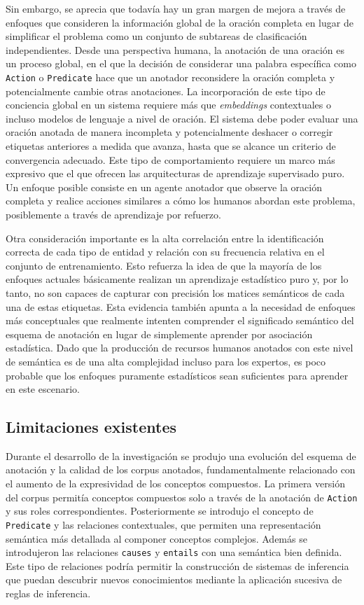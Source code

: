 Sin embargo, se aprecia que todavía hay un gran margen de mejora a través de enfoques que consideren la información global de la oración completa en lugar de simplificar el problema como un conjunto de subtareas de clasificación independientes. Desde una perspectiva humana, la anotación de una oración es un proceso global, en el que la decisión de considerar una palabra específica como \texttt{Action} o \texttt{Predicate} hace que un anotador reconsidere la oración completa y potencialmente cambie otras anotaciones. La incorporación de este tipo de conciencia global en un sistema requiere más que \textit{embeddings} contextuales o incluso modelos de lenguaje a nivel de oración. El sistema debe poder evaluar una oración anotada de manera incompleta y potencialmente deshacer o corregir etiquetas anteriores a medida que avanza, hasta que se alcance un criterio de convergencia adecuado. Este tipo de comportamiento requiere un marco más expresivo que el que ofrecen las arquitecturas de aprendizaje supervisado puro. Un enfoque posible consiste en un agente anotador que observe la oración completa y realice acciones similares a cómo los humanos abordan este problema, posiblemente a través de aprendizaje por refuerzo.

Otra consideración importante es la alta correlación entre la identificación correcta de cada tipo de entidad y relación con su frecuencia relativa en el conjunto de entrenamiento.
Esto refuerza la idea de que la mayoría de los enfoques actuales básicamente realizan un aprendizaje estadístico puro y, por lo tanto, no son capaces de capturar con precisión los matices semánticos de cada una de estas etiquetas.
Esta evidencia también apunta a la necesidad de enfoques más conceptuales que realmente intenten comprender el significado semántico del esquema de anotación en lugar de simplemente aprender por asociación estadística. Dado que la producción de recursos humanos anotados con este nivel de semántica es de una alta complejidad incluso para los expertos, es poco probable que los enfoques puramente estadísticos sean suficientes para aprender en este escenario.

\subsection{Limitaciones existentes}

Durante el desarrollo de la investigación se produjo una evolución del esquema de anotación y la calidad de los corpus anotados, fundamentalmente relacionado con el aumento de la expresividad de los conceptos compuestos. La primera versión del corpus permitía conceptos compuestos solo a través de la anotación de \texttt{Action} y sus roles correspondientes. Posteriormente se introdujo el concepto de \texttt{Predicate} y las relaciones contextuales, que permiten una representación semántica más detallada al componer conceptos complejos. Además se introdujeron las relaciones \texttt{causes} y \texttt{entails} con una semántica bien definida. Este tipo de relaciones podría permitir la construcción de sistemas de inferencia que puedan descubrir nuevos conocimientos mediante la aplicación sucesiva de reglas de inferencia.

